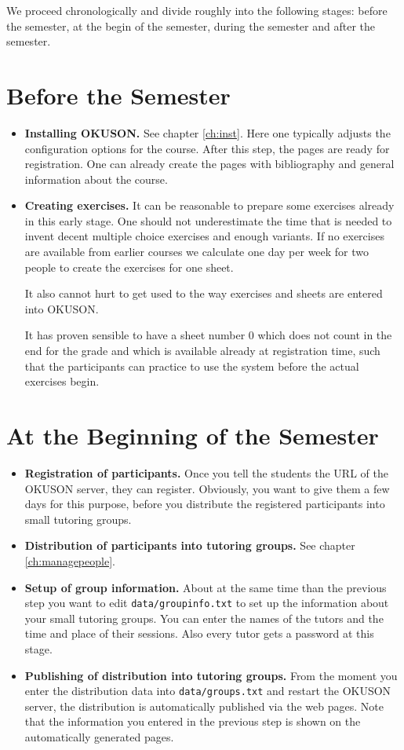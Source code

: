 \documentclass[12pt,openany,a4paper]{book}
\newcommand{\OKUSON}{\textsf{OKUSON}}
\begin{document}
We proceed chronologically and divide roughly into the following stages:
before the semester, at the begin of the semester, during the semester
and after the semester.

\section{Before the Semester}

\begin{itemize}
\item \textbf{Installing {\OKUSON}.} See chapter \ref{ch:inst}. Here one
typically adjusts the configuration options for the course. After this
step, the pages are ready for registration. One can already create the
pages with bibliography and general information about the course.
\item \textbf{Creating exercises.} It can be reasonable to prepare some
exercises already in this early stage. One should not underestimate the
time that is needed to invent decent multiple choice exercises and enough
variants. If no exercises are available from earlier courses we calculate
one day per week for two people to create the exercises for one sheet.

It also cannot hurt to get used to the way exercises and sheets are entered
into {\OKUSON}.

It has proven sensible to have a sheet number $0$ which does not count in
the end for the grade and which is available already at registration time,
such that the participants can practice to use the system before the 
actual exercises begin.
\end{itemize}

\section{At the Beginning of the Semester}

\begin{itemize}
\item \textbf{Registration of participants.} Once you tell the students
the URL of the {\OKUSON} server, they can register. Obviously, you want
to give them a few days for this purpose, before you distribute the
registered participants into small tutoring groups.
\item \textbf{Distribution of participants into tutoring groups.} See
chapter \ref{ch:managepeople}. 
\item \textbf{Setup of group information.} About at the same time than
the previous step you want to edit \texttt{data/groupinfo.txt} to set
up the information about your small tutoring groups. You can enter the
names of the tutors and the time and place of their sessions. Also every
tutor gets a password at this stage.
\item \textbf{Publishing of distribution into tutoring groups.} From the
moment you enter the distribution data into \texttt{data/groups.txt}
and restart the {\OKUSON} server, the distribution is automatically
published via the web pages. Note that the information you entered in
the previous step is shown on the automatically generated pages.
\end{itemize}
\end{document}
